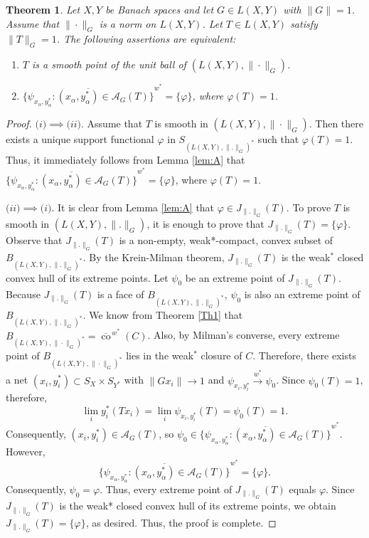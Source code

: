 \documentclass[12pt]{amsart}
\newtheorem{theorem}{Theorem}[section]
\theoremstyle{definition}
\numberwithin{equation}{section}
\begin{document}
	
	\begin{theorem}\label{thm:smooth-G-infinite}
		Let $X,Y$ be Banach spaces and let $G\in L(X, Y )$ with $\|G\|=1$.
		Assume that $\|\cdot\|_G$ is a norm on $ L(X, Y )$.
		Let $T\in L(X, Y )$ satisfy $\|T\|_G=1$.
		The following assertions are equivalent:
		\begin{enumerate}
			\item[(i)]
			$T$ is a smooth point of the unit ball of $( L(X, Y ),\|\cdot\|_G)$.
			\item[(ii)]
			$\overline{\{\psi_{x_\alpha,y_\alpha^*}:(x_\alpha,y_\alpha^*)\in\mathcal A_G(T)\}}^{w^*}=\{\varphi\}$, where $\varphi (T)=1$. 
		\end{enumerate}
	\end{theorem}
	\begin{proof}
		$\textit{(i)}\implies \textit{(ii)}.$
		Assume that $T$ is smooth in $(L(X, Y), \|\cdot\|_G)$. Then there exists a unique support functional $\varphi$ in
		$S_{( L(X, Y ), \|.\|_G)^*}$ such that $\varphi(T)=1$. Thus, it immediately follows from Lemma \ref{lem:A} that $\overline{\{\psi_{x_\alpha,y_\alpha^*}:(x_\alpha,y_\alpha^*)\in\mathcal A_G(T)\}}^{w^*}=\{\varphi\}$, where $\varphi (T)=1$.
		
		\medskip
		
		\noindent
		$\textit{(ii)}\implies \textit{(i)}.$
		It is clear from Lemma \ref{lem:A} that $\varphi\in J_{\|.\|_G}(T)$. To prove $T$ is smooth in $(L(X, Y), \|.\|_G)$, it is enough to prove that $J_{\|.\|_G}(T)=\{\varphi\}$. Observe that $J_{\|.\|_G}(T)$ is a non-empty, weak*-compact, convex subset of $B_{(L(X, Y), \|.\|_G)^*}$. By the Krein-Milman theorem, $J_{\|.\|_G}(T)$ is the weak$^*$ closed convex hull of its extreme points. Let $\psi_0$ be an extreme point of $J_{\|.\|_G}(T)$. Because $J_{\|.\|_G}(T)$ is a face of $B_{( L(X, Y), \|.\|_G)^*}$, $\psi_0$ is also an extreme point of $B_{( L(X, Y), \|.\|_G)^*}$. We know from Theorem \ref{Th1} that $B_{( L(X, Y), \|\cdot\|_G)^*} = \overline{\operatorname{co}}^{\,w^*}(C)$. Also, by Milman's converse, every extreme point of $B_{( L(X, Y), \|\cdot\|_G)^*}$ lies in the weak$^*$ closure of $C$. Therefore, there exists a net $(x_i,y_i^*)\subset S_X\times S_{Y^*}$ with $\|Gx_i\|\to 1$ and $\psi_{x_i,y_i^*}\xrightarrow{w^*}\psi_0$. Since $\psi_0(T)=1$, therefore,
		\[
		\lim_i y_i^*(Tx_i)=\lim_i\psi_{x_i,y_i^*}(T)=\psi_0(T)=1.
		\]
		Consequently, $(x_i,y_i^*)\in \mathcal{A}_G(T)$, so $\psi_0\in \overline{\{\psi_{x_\alpha,y_\alpha^*}:(x_\alpha,y_\alpha^*)\in\mathcal A_G(T)\}}^{w^*}$. However, 
		\[
		\overline{\{\psi_{x_\alpha,y_\alpha^*}:(x_\alpha,y_\alpha^*)\in\mathcal A_G(T)\}}^{w^*}=\{\varphi\}.
		\]
		Consequently, $\psi_0=\varphi$. Thus, every extreme point of $J_{\|.\|_G}(T)$ equals $\varphi$. Since $J_{\|.\|_G}(T)$ is the weak* closed convex hull of its extreme points, we obtain $J_{\|.\|_G}(T)=\{\varphi\}$, as desired. Thus, the proof is complete.
	\end{proof}
	
\end{document}
